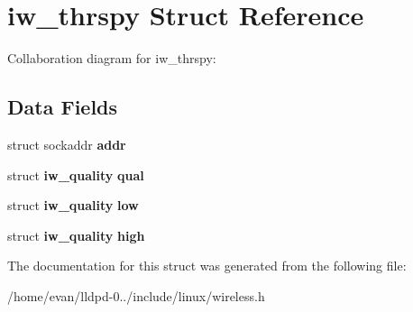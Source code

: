 \section{iw\-\_\-thrspy \-Struct \-Reference}
\label{structiw__thrspy}


\-Collaboration diagram for iw\-\_\-thrspy\-:
\subsection*{\-Data \-Fields}
\begin{DoxyCompactItemize}
\item 
struct sockaddr {\bfseries addr}\label{structiw__thrspy_a979fbf6cbda14801a80be566a480f4ad}

\item 
struct {\bf iw\-\_\-quality} {\bfseries qual}\label{structiw__thrspy_a7e12691da450e02fbae12365d41697ba}

\item 
struct {\bf iw\-\_\-quality} {\bfseries low}\label{structiw__thrspy_ae207c0294caa98aab7bd22d2c316e3cc}

\item 
struct {\bf iw\-\_\-quality} {\bfseries high}\label{structiw__thrspy_a7c47e946d75bfc42379eb762cd412e86}

\end{DoxyCompactItemize}


\-The documentation for this struct was generated from the following file\-:\begin{DoxyCompactItemize}
\item 
/home/evan/lldpd-\/0../include/linux/wireless.\-h\end{DoxyCompactItemize}
